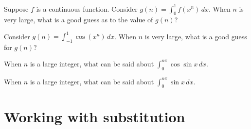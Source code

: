 \documentclass{ximera}
\begin{document}
\begin{problem}
  Suppose $f$ is a continuous function.  Consider $g(n) = \int_0^1 f(x^n) \, dx$.  When $n$ is very large, what is a good guess as to the value of $g(n)$?
  \begin{multipleChoice}
  \end{multipleChoice}
\end{problem}

\begin{problem}
  Consider $g(n) = \int_{-1}^1 \cos(x^n) \, dx$.  When $n$ is very large, what is a good guess for $g(n)$?
  \begin{multipleChoice}
  \end{multipleChoice}
\end{problem}

\begin{problem}
  When $n$ is a large integer, what can be said about $\int_0^{n \pi} \cos \sin x \, dx$.
  \begin{multipleChoice}
  \end{multipleChoice}
\end{problem}

\begin{problem}
  When $n$ is a large integer, what can be said about $\int_0^{n \pi} \sin x \, dx$.
  \begin{multipleChoice}
  \end{multipleChoice}
\end{problem}

\clearpage

\section{Working with substitution}
\end{document}
